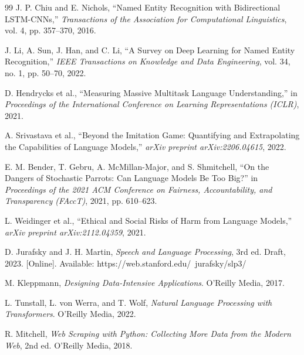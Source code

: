 \documentclass[conference]{IEEEtran}
\begin{document}
\begin{thebibliography}{99}
J. P. Chiu and E. Nichols, ``Named Entity Recognition with Bidirectional LSTM-CNNs,'' \textit{Transactions of the Association for Computational Linguistics}, vol. 4, pp. 357--370, 2016.

J. Li, A. Sun, J. Han, and C. Li, ``A Survey on Deep Learning for Named Entity Recognition,'' \textit{IEEE Transactions on Knowledge and Data Engineering}, vol. 34, no. 1, pp. 50--70, 2022.

D. Hendrycks et al., ``Measuring Massive Multitask Language Understanding,'' in \textit{Proceedings of the International Conference on Learning Representations (ICLR)}, 2021.

A. Srivastava et al., ``Beyond the Imitation Game: Quantifying and Extrapolating the Capabilities of Language Models,'' \textit{arXiv preprint arXiv:2206.04615}, 2022.

E. M. Bender, T. Gebru, A. McMillan-Major, and S. Shmitchell, ``On the Dangers of Stochastic Parrots: Can Language Models Be Too Big?'' in \textit{Proceedings of the 2021 ACM Conference on Fairness, Accountability, and Transparency (FAccT)}, 2021, pp. 610--623.

L. Weidinger et al., ``Ethical and Social Risks of Harm from Language Models,'' \textit{arXiv preprint arXiv:2112.04359}, 2021.

D. Jurafsky and J. H. Martin, \textit{Speech and Language Processing}, 3rd ed. Draft, 2023. [Online]. Available: https://web.stanford.edu/~jurafsky/slp3/

M. Kleppmann, \textit{Designing Data-Intensive Applications}. O'Reilly Media, 2017.

L. Tunstall, L. von Werra, and T. Wolf, \textit{Natural Language Processing with Transformers}. O'Reilly Media, 2022.

R. Mitchell, \textit{Web Scraping with Python: Collecting More Data from the Modern Web}, 2nd ed. O'Reilly Media, 2018.

\end{thebibliography}
\end{document}
